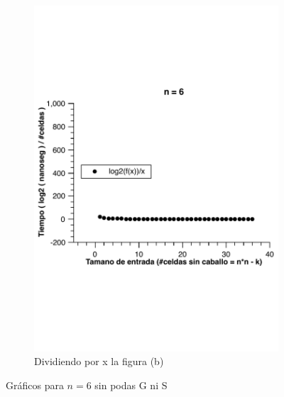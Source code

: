 \begin{figure}[H]
        \begin{subfigure}[b]{0.5\textwidth}
                \includegraphics[width=\textwidth]{imagenes/grafico3-n-6-div-log.pdf}
                \caption{Dividiendo por x la figura (b)}
        \end{subfigure}
        \caption{Gráficos para $n=6$ sin podas G ni S}
\end{figure}

